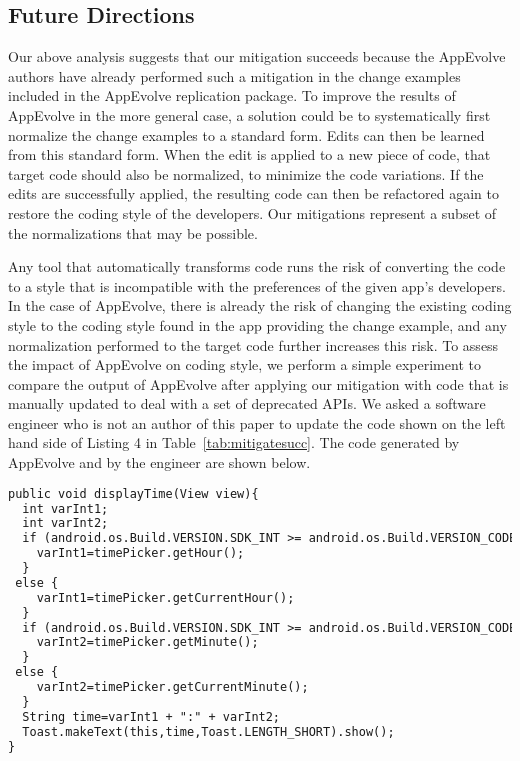 \subsection{Future Directions}

Our above analysis suggests that our mitigation succeeds because the
AppEvolve authors have already performed such a mitigation in the change
examples included in the AppEvolve replication package.  To improve the
results of AppEvolve in the more general case, a solution could be to
systematically first normalize the change examples to a standard form.
Edits can then be learned from this standard form. When the edit is applied
to a new piece of code, that target code should also be normalized, to
minimize the code variations. If the edits are successfully applied, the
resulting code can then be refactored again to restore the coding style of
the developers.  Our mitigations represent a subset of the normalizations
that may be possible.

Any tool that automatically transforms code runs the risk of converting the
code to a style that is incompatible with the preferences of the given
app's developers.  In the case of AppEvolve, there is already the risk of
changing the existing coding style to the coding style found in the app
providing the change example, and any normalization performed to the target
code further increases this risk.  To assess the impact of AppEvolve on
coding style, we perform a simple experiment to compare the output of
AppEvolve after applying our mitigation with code that is manually updated
to deal with a set of deprecated APIs.  We asked a software engineer who is
not an author of this paper to update the code shown on the left hand side
of Listing 4 in Table~\ref{tab:mitigatesucc}. The code generated by
AppEvolve and by the engineer are shown below.


\vspace{0.2cm}
\begin{lstlisting}[language=diff,numbers=none]
public void displayTime(View view){
  int varInt1;
  int varInt2;
  if (android.os.Build.VERSION.SDK_INT >= android.os.Build.VERSION_CODES.M) {
    varInt1=timePicker.getHour();
  }
 else {
    varInt1=timePicker.getCurrentHour();
  }
  if (android.os.Build.VERSION.SDK_INT >= android.os.Build.VERSION_CODES.M) {
    varInt2=timePicker.getMinute();
  }
 else {
    varInt2=timePicker.getCurrentMinute();
  }
  String time=varInt1 + ":" + varInt2;
  Toast.makeText(this,time,Toast.LENGTH_SHORT).show();
}
\end{lstlisting}


